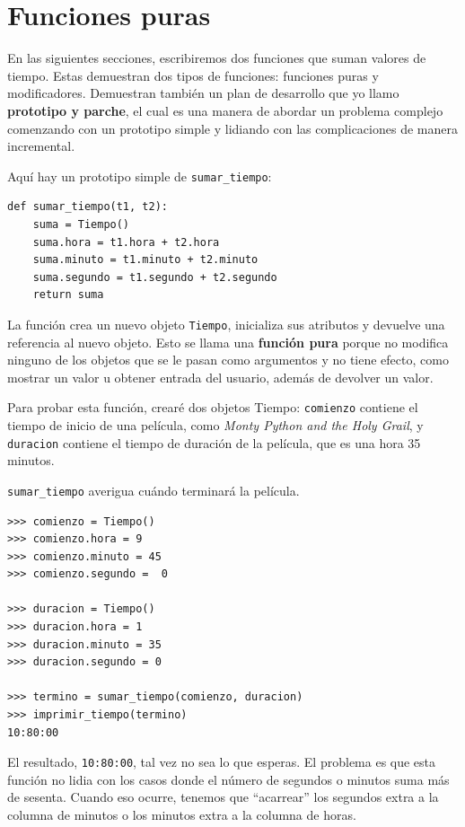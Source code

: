 \documentclass[10pt]{book}
\begin{document}
\section{Funciones puras}

En las siguientes secciones, escribiremos dos funciones que suman valores de
tiempo.  Estas demuestran dos tipos de funciones: funciones puras y
modificadores.  Demuestran también un plan de desarrollo que yo llamo {\bf
  prototipo y parche}, el cual es una manera de abordar un problema complejo
comenzando con un prototipo simple y lidiando con las complicaciones
de manera incremental.

Aquí hay un prototipo simple de \verb"sumar_tiempo":

\begin{verbatim}
def sumar_tiempo(t1, t2):
    suma = Tiempo()
    suma.hora = t1.hora + t2.hora
    suma.minuto = t1.minuto + t2.minuto
    suma.segundo = t1.segundo + t2.segundo
    return suma
\end{verbatim}
%
La función crea un nuevo objeto {\tt Tiempo}, inicializa sus
atributos y devuelve una referencia al nuevo objeto.  Esto se llama
una {\bf función pura} porque no modifica ninguno de los objetos
que se le pasan como argumentos y no tiene efecto,
como mostrar un valor u obtener entrada del usuario,
además de devolver un valor.

Para probar esta función, crearé dos objetos Tiempo: {\tt comienzo}
contiene el tiempo de inicio de una película, como {\em Monty Python and the
Holy Grail}, y {\tt duracion} contiene el tiempo de duración de la película,
que es una hora 35 minutos.

\verb"sumar_tiempo" averigua cuándo terminará la película.

\begin{verbatim}
>>> comienzo = Tiempo()
>>> comienzo.hora = 9
>>> comienzo.minuto = 45
>>> comienzo.segundo =  0

>>> duracion = Tiempo()
>>> duracion.hora = 1
>>> duracion.minuto = 35
>>> duracion.segundo = 0

>>> termino = sumar_tiempo(comienzo, duracion)
>>> imprimir_tiempo(termino)
10:80:00
\end{verbatim}
%
El resultado, {\tt 10:80:00}, tal vez no sea lo que
esperas.  El problema es que esta función no lidia con los casos donde el
número de segundos o minutos suma más de sesenta.  Cuando eso
ocurre, tenemos que ``acarrear'' los segundos extra a la columna de minutos
o los minutos extra a la columna de horas.
\end{document}
